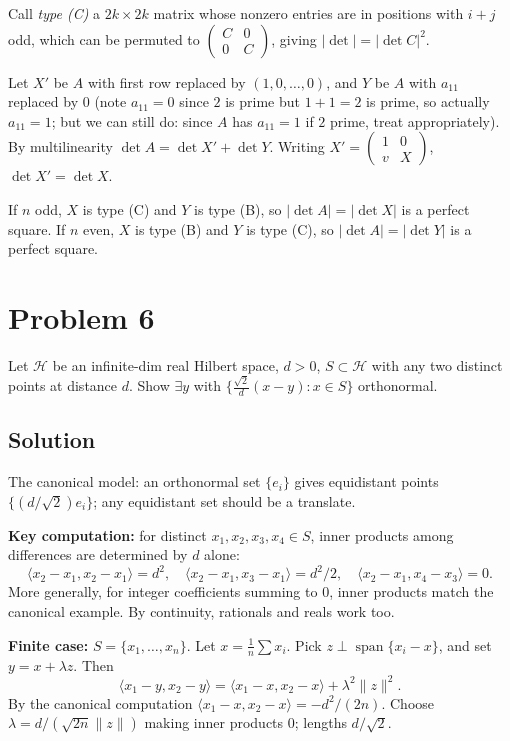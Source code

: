 \documentclass{article}
\begin{document}
Call \emph{type (C)} a $2k \times 2k$ matrix whose nonzero entries are in positions with $i + j$ odd, which can be permuted to $\begin{pmatrix} C & 0 \\ 0 & C \end{pmatrix}$, giving $|\det| = |\det C|^2$.

Let $X'$ be $A$ with first row replaced by $(1, 0, \ldots, 0)$, and $Y$ be $A$ with $a_{11}$ replaced by $0$ (note $a_{11} = 0$ since $2$ is prime but $1 + 1 = 2$ is prime, so actually $a_{11} = 1$; but we can still do: since $A$ has $a_{11} = 1$ if $2$ prime, treat appropriately). By multilinearity $\det A = \det X' + \det Y$. Writing $X' = \begin{pmatrix} 1 & 0 \\ v & X \end{pmatrix}$, $\det X' = \det X$.

If $n$ odd, $X$ is type (C) and $Y$ is type (B), so $|\det A| = |\det X|$ is a perfect square. If $n$ even, $X$ is type (B) and $Y$ is type (C), so $|\det A| = |\det Y|$ is a perfect square.

\section*{Problem 6}
Let $\mathcal H$ be an infinite-dim real Hilbert space, $d > 0$, $S \subset \mathcal H$ with any two distinct points at distance $d$. Show $\exists y$ with $\{\tfrac{\sqrt 2}{d}(x - y) : x \in S\}$ orthonormal.

\subsection*{Solution}
The canonical model: an orthonormal set $\{e_i\}$ gives equidistant points $\{(d/\sqrt 2) e_i\}$; any equidistant set should be a translate.

\textbf{Key computation:} for distinct $x_1, x_2, x_3, x_4 \in S$, inner products among differences are determined by $d$ alone:
\[
\langle x_2 - x_1, x_2 - x_1\rangle = d^2, \quad \langle x_2 - x_1, x_3 - x_1\rangle = d^2/2, \quad \langle x_2 - x_1, x_4 - x_3\rangle = 0.
\]
More generally, for integer coefficients summing to $0$, inner products match the canonical example. By continuity, rationals and reals work too.

\textbf{Finite case:} $S = \{x_1, \ldots, x_n\}$. Let $x = \tfrac{1}{n}\sum x_i$. Pick $z \perp \operatorname{span}\{x_i - x\}$, and set $y = x + \lambda z$. Then
\[
\langle x_1 - y, x_2 - y\rangle = \langle x_1 - x, x_2 - x\rangle + \lambda^2 \|z\|^2.
\]
By the canonical computation $\langle x_1 - x, x_2 - x\rangle = -d^2/(2n)$. Choose $\lambda = d/(\sqrt{2n} \|z\|)$ making inner products $0$; lengths $d/\sqrt 2$.
\end{document}
